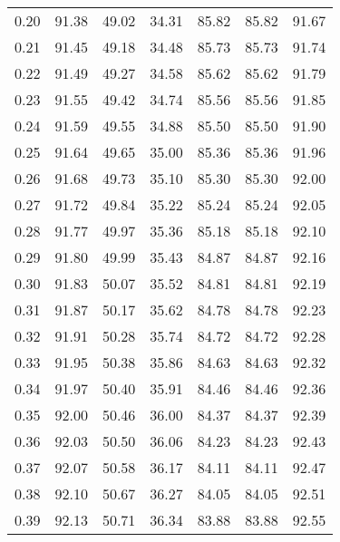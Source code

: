 \begin{tabular}{|c|c|c|c|c|c|c|}
      0.20 &     91.38 &     49.02 &      34.31 &   85.82 &      85.82 &         91.67 \\
      0.21 &     91.45 &     49.18 &      34.48 &   85.73 &      85.73 &         91.74 \\
      0.22 &     91.49 &     49.27 &      34.58 &   85.62 &      85.62 &         91.79 \\
      0.23 &     91.55 &     49.42 &      34.74 &   85.56 &      85.56 &         91.85 \\
      0.24 &     91.59 &     49.55 &      34.88 &   85.50 &      85.50 &         91.90 \\
      0.25 &     91.64 &     49.65 &      35.00 &   85.36 &      85.36 &         91.96 \\
      0.26 &     91.68 &     49.73 &      35.10 &   85.30 &      85.30 &         92.00 \\
      0.27 &     91.72 &     49.84 &      35.22 &   85.24 &      85.24 &         92.05 \\
      0.28 &     91.77 &     49.97 &      35.36 &   85.18 &      85.18 &         92.10 \\
      0.29 &     91.80 &     49.99 &      35.43 &   84.87 &      84.87 &         92.16 \\
      0.30 &     91.83 &     50.07 &      35.52 &   84.81 &      84.81 &         92.19 \\
      0.31 &     91.87 &     50.17 &      35.62 &   84.78 &      84.78 &         92.23 \\
      0.32 &     91.91 &     50.28 &      35.74 &   84.72 &      84.72 &         92.28 \\
      0.33 &     91.95 &     50.38 &      35.86 &   84.63 &      84.63 &         92.32 \\
      0.34 &     91.97 &     50.40 &      35.91 &   84.46 &      84.46 &         92.36 \\
      0.35 &     92.00 &     50.46 &      36.00 &   84.37 &      84.37 &         92.39 \\
      0.36 &     92.03 &     50.50 &      36.06 &   84.23 &      84.23 &         92.43 \\
      0.37 &     92.07 &     50.58 &      36.17 &   84.11 &      84.11 &         92.47 \\
      0.38 &     92.10 &     50.67 &      36.27 &   84.05 &      84.05 &         92.51 \\
      0.39 &     92.13 &     50.71 &      36.34 &   83.88 &      83.88 &         92.55 \\

\end{tabular}
